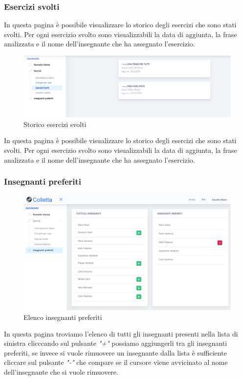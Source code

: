         \subsubsection{Esercizi svolti}
                 In questa pagina è possibile visualizzare lo storico degli esercizi che sono stati svolti. Per ogni esercizio svolto sono visualizzabili la data di aggiunta, la frase analizzata e il nome dell'insegnante che ha assegnato l'esercizio.
        	\begin{figure}[H]
            	\centering
            	\includegraphics[width=17cm]{sez/img/studente/esercizisvolti.PNG} 
            	\caption{Storico esercizi svolti}\label{fig:1}
        	\end{figure}
          In questa pagina è possibile visualizzare lo storico degli esercizi che sono stati svolti. Per ogni esercizio svolto sono visualizzabili la data di aggiunta, la frase analizzata e il nome dell'insegnante che ha assegnato l'esercizio.
        
        
        
\subsubsection{Insegnanti preferiti}
        	\begin{figure}[H]
            	\centering
            	\includegraphics[width=17cm]{sez/img/studente/insegnantepreferito.png} 
            	\caption{Elenco insegnanti preferiti}\label{fig:1}
        	\end{figure}        
        In questa pagina troviamo l'elenco di tutti gli insegnanti presenti nella lista di sinistra clicccando sul pulsante \textit{"+"} possiamo aggiungerli tra gli insegnanti preferiti, se invece si vuole rimuovere un insegnante dalla lista è sufficiente cliccare sul pulsante \textit{"-"} che compare se il cursore viene avvicinato al nome dell'insegnante che si vuole rimuovere.
        
